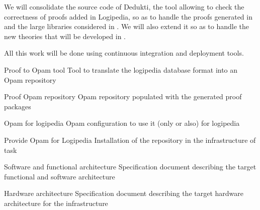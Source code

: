 \begin{workpackage}[id=access,wphases=0-48,type=MGT,
  short=Access,%
  title={Access to the infrastructure},
  lead=Irt,IrtRM=23,OcaRM=6,EduRM=12,InrRM=18]
\begin{tasklist}
\begin{task}[id=dedukti,
      title=Development of Dedukti checking and translation tools
      lead=Irt,InrRM=24]
    We will consolidate the source code of Dedukti, the tool allowing
    to check the correctness of proofs added in Logipedia, so as to
    handle the proofs generated in  and the
    large libraries considered in . We will also
    extend it so as to handle the new theories that will be developed
    in .

    All this work will be done using continuous integration and
    deployment tools.
  \end{task}
  
\end{tasklist}

\begin{wpdelivs}
  \begin{wpdeliv}[due=2,miles=???,id=opamtool,dissem=PU,nature=DEM,lead=Oca]{Proof to Opam tool}
    Tool to translate the logipedia database format into an Opam repository
  \end{wpdeliv}

  \begin{wpdeliv}[due=2,miles=???,id=opamrepo,dissem=PU,nature=DEM,lead=Oca]{Proof Opam repository}
    Opam repository populated with the generated proof packages
  \end{wpdeliv}

  \begin{wpdeliv}[due=1,miles=???,id=opamconfig,dissem=PU,nature=DEM,lead=Oca]{Opam for logipedia}
    Opam configuration to use it (only or also) for logipedia
  \end{wpdeliv}

  \begin{wpdeliv}[due=1,miles=???,id=opaminstall,dissem=PU,nature=DEM,lead=Oca]{Provide Opam for Logipedia}
    Installation of the repository in the infrastructure of task 
  \end{wpdeliv}

  \begin{wpdeliv}[due=18,miles=???,id=archi-spec,dissem=PU,nature=R,lead=Irt]{Software and functional architecture}
    Specification document describing the target functional and software architecture
  \end{wpdeliv}

  \begin{wpdeliv}[due=20,miles=???,id=infra-spec,dissem=PU,nature=R,lead=Irt]{Hardware architecture}
    Specification document describing the target hardware architecture for the infrastructure
  \end{wpdeliv}


\end{wpdelivs}
\end{workpackage}
